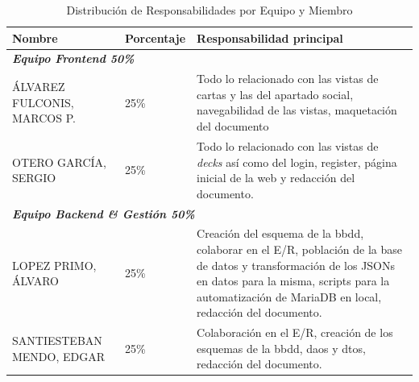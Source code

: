 \documentclass[10pt]{article}
\begin{document}
	\begin{table}[h]
		\centering
	
		\begin{tabularx}{\textwidth}{llX} 
			\toprule
			\textbf{Nombre} & \textbf{Porcentaje} & \textbf{Responsabilidad principal} \\
			\midrule
			\multicolumn{3}{l}{\textit{\textbf{Equipo Frontend 50\%}}}  \\
			\midrule
			ÁLVAREZ FULCONIS, MARCOS P. & 25\% & Todo lo relacionado con las vistas de cartas y las del apartado social, navegabilidad de las vistas, maquetación  del documento  \\
			OTERO GARCÍA, SERGIO        & 25\% & Todo lo relacionado con  las vistas de \textit{decks} así como del login, register, página inicial de la web y redacción del documento.  \\
			\midrule
			\multicolumn{3}{l}{\textit{\textbf{Equipo Backend \& Gestión 50\%}}} \\
			\midrule
			LOPEZ PRIMO, ÁLVARO         & 25\% &  Creación del esquema de la bbdd, colaborar en el E/R, población de la base de datos y transformación de los JSONs en datos para la misma, scripts para la automatización de MariaDB en local, redacción del documento. \\
			SANTIESTEBAN MENDO, EDGAR   & 25\% & Colaboración en el E/R, creación de los esquemas de la bbdd, daos y dtos, redacción del documento. \\
			\bottomrule
		\end{tabularx}
			\caption{Distribución de Responsabilidades por Equipo y Miembro}
	\end{table}
	
	
\end{document}
